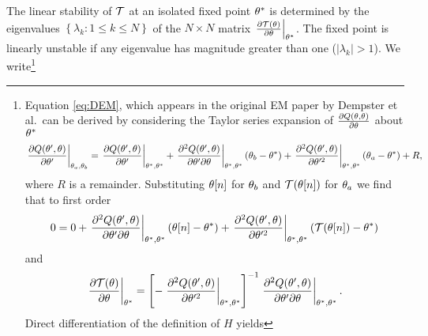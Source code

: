 The linear stability of $\EMmap$ at an isolated fixed point
$\theta^*$ is determined by the eigenvalues
$\left\{\lambda_k:1\leq k \leq N \right\}$ of the $N\times N$ matrix
$\left. \frac{\partial \EMmap(\parameters) }{ \partial \parameters
  }\right| _{\parameters^*}$.  The fixed point is linearly unstable if
any eigenvalue has magnitude greater than one ($\left| \lambda_k
\right| > 1$). We write\footnote{Equation \eqref{eq:DEM}, which
  appears in the original EM paper by Dempster et al.\, can be derived
  by considering the Taylor series expansion of $\frac{\partial
    Q(\theta,\theta)}{\partial \theta}$ about
  $\theta^*$
  \begin{equation*}
    \left. \frac{\partial Q(\parameters',\parameters)}{\partial \parameters'}
    \right|_{\parameters_a,\parameters_b} = \left. \frac{\partial
        Q(\parameters',\parameters)}{\partial \parameters'}
    \right|_{\parameters^*,\parameters^*} %
    + \left. \frac{\partial^2 Q(\parameters',\parameters)}{\partial
        \parameters' \partial \parameters} \right|_{\parameters^*,\parameters^*}
    (\parameters_b -  \parameters^*) %
    + \left. \frac{\partial^2 Q(\parameters',\parameters)}{\partial
        \parameters'^2} \right|_{\parameters^*,\parameters^*}
    (\parameters_a - \parameters^*) + R,
  \end{equation*}
  where $R$ is a remainder.  Substituting ${\theta}{[n]}$ for
  $\theta_b$ and $\EMmap(\ti{\parameters}{n})$ for
  $\theta_a$ we find that to first order
  \begin{equation*}
    0 = 0 + \left. \frac{\partial^2 Q(\parameters',\parameters)}{\partial
        \parameters' \partial \parameters} \right|_{\parameters^*,\parameters^*}
    (\ti{\parameters}{n} - \parameters^*) %
    + \left. \frac{\partial^2 Q(\parameters',\parameters)}{\partial
        \parameters'^2} \right|_{\parameters^*,\parameters^*} (\EMmap(\ti{\parameters}{n}) -
    \parameters^*)
  \end{equation*}
  and
  \begin{equation}
    \label{eq:FN1}
    \left. \frac{ \partial \EMmap(\parameters)}{\partial \parameters} \right|_{\parameters^*} = %
    \left[- \left. \frac{\partial^2 Q(\parameters',\parameters)}{\partial
          \parameters'^2} \right|_{\parameters^*,\parameters^*} \right]^{-1} %
    \left. \frac{\partial^2 Q(\parameters',\parameters)}{\partial
        \parameters' \partial \parameters} \right|_{\parameters^*,\parameters^*}.
  \end{equation}
  Direct differentiation of the definition of $H$ yields
}
